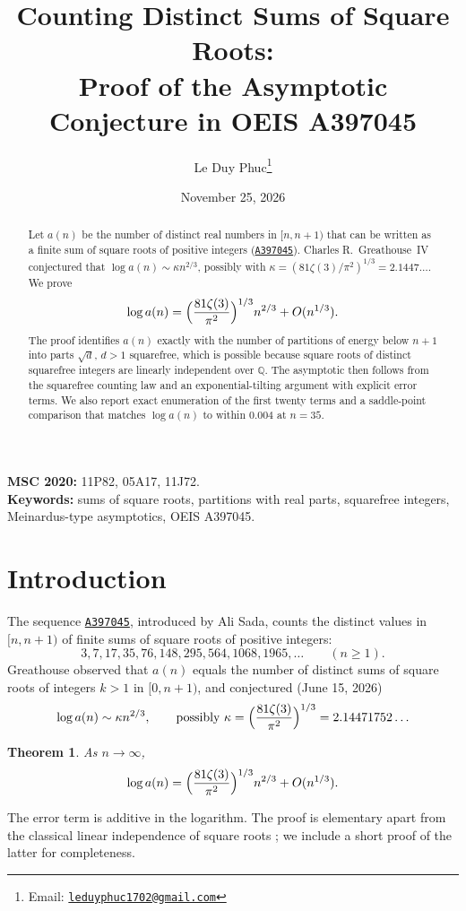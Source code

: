 \documentclass[11pt,a4paper]{article}
\title{Counting Distinct Sums of Square Roots:\\
Proof of the Asymptotic Conjecture in OEIS A397045}
\author{Le Duy Phuc\thanks{Email: \href{mailto:leduyphuc1702@gmail.com}{\texttt{leduyphuc1702@gmail.com}}}}
\date{November 25, 2026}
\newtheorem{theorem}{Theorem}
\theoremstyle{remark}
\newcommand{\oeis}[1]{\href{https://oeis.org/#1}{\texttt{#1}}}
\begin{document}
\maketitle

\begin{abstract}
Let $a(n)$ be the number of distinct real numbers in $[n,n+1)$ that can be written as a finite sum of square roots of positive integers (\oeis{A397045}). Charles R.~Greathouse~IV conjectured that $\log a(n)\sim\kappa n^{2/3}$, possibly with $\kappa=(81\zeta(3)/\pi^2)^{1/3}=2.1447\ldots$. We prove
\[
 \log a(n)=\Bigl(\frac{81\zeta(3)}{\pi^2}\Bigr)^{1/3}n^{2/3}+O(n^{1/3}).
\]
The proof identifies $a(n)$ exactly with the number of partitions of energy below $n+1$ into parts $\sqrt d$, $d>1$ squarefree, which is possible because square roots of distinct squarefree integers are linearly independent over $\mathbb Q$. The asymptotic then follows from the squarefree counting law and an exponential-tilting argument with explicit error terms. We also report exact enumeration of the first twenty terms and a saddle-point comparison that matches $\log a(n)$ to within $0.004$ at $n=35$.
\end{abstract}

\noindent\textbf{MSC 2020:} 11P82, 05A17, 11J72.\\
\textbf{Keywords:} sums of square roots, partitions with real parts, squarefree integers, Meinardus-type asymptotics, OEIS A397045.

\section{Introduction}

The sequence \oeis{A397045}, introduced by Ali Sada, counts the distinct values in $[n,n+1)$ of finite sums of square roots of positive integers:
\[
 3,7,17,35,76,148,295,564,1068,1965,\ldots\qquad(n\ge1).
\]
Greathouse observed that $a(n)$ equals the number of distinct sums of square roots of integers $k>1$ in $[0,n+1)$, and conjectured (June 15, 2026)
\[
 \log a(n)\sim\kappa n^{2/3},\qquad \text{possibly } \kappa=\Bigl(\frac{81\zeta(3)}{\pi^2}\Bigr)^{1/3}=2.14471752\ldots
\]

\begin{theorem}\label{thm:main}
As $n\to\infty$,
\[
 \log a(n)=\Bigl(\frac{81\zeta(3)}{\pi^2}\Bigr)^{1/3}n^{2/3}+O(n^{1/3}).
\]
\end{theorem}

The error term is additive in the logarithm. The proof is elementary apart from the classical linear independence of square roots \cite{Besicovitch}; we include a short proof of the latter for completeness.
\end{document}
